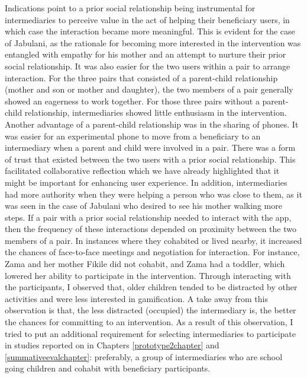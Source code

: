 Indications point to a prior social relationship being instrumental for intermediaries to perceive value in the act of helping their beneficiary users, in which case the interaction became more meaningful. This is evident for the case of Jabulani, as the rationale for becoming more interested in the intervention was entangled with empathy for his mother and an attempt to nurture their prior social relationship. It was also easier for the two users within a pair to arrange interaction. For the three pairs that consisted of a parent-child relationship (mother and son or mother and daughter), the two members of a pair generally showed an eagerness to work together. For those three pairs without a parent-child relationship, intermediaries showed little enthusiasm in the intervention. Another advantage of a parent-child relationship was in the sharing of phones. It was easier for an experimental phone to move from a beneficiary to an intermediary when a parent and child were involved in a pair. There was a form of trust that existed between the two users with a prior social relationship. This facilitated collaborative reflection which we have already highlighted that it might be important for enhancing user experience. In addition, intermediaries had more authority when they were helping a person who was close to them, as it was seen in the case of Jabulani who desired to see his mother walking more steps. If a pair with a prior social relationship needed to interact with the app, then the frequency of these interactions depended on proximity between the two members of a pair. In instances where they cohabited or lived nearby, it increased the chances of face-to-face meetings and negotiation for interaction. For instance, Zama and her mother Fikile did not cohabit, and Zama had a toddler, which lowered her ability to participate in the intervention. Through interacting with the participants, I observed that, older children tended to be distracted by other activities and were less interested in gamification.  A take away from this observation is that, the less distracted (occupied) the intermediary is, the better the chances for committing to an intervention. As a result of this observation, I tried to put an additional requirement for selecting intermediaries to participate in studies reported on in Chapters \ref{prototype2chapter} and \ref{summativeevalchapter}: preferably, a group of intermediaries who are school going children and cohabit with beneficiary participants.    

